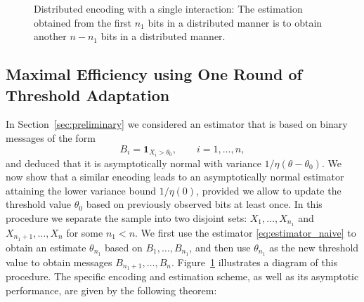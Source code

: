 \begin{figure}
\begin{center}
\end{center}
\caption{Distributed encoding with a single interaction: The estimation obtained from the first $n_1$ bits in a distributed manner is to obtain another $n-n_1$ bits in a distributed manner. 
\label{fig:one_round}
}
\end{figure}

\subsection{Maximal Efficiency using One Round of Threshold Adaptation}
In Section~\ref{sec:preliminary} we considered an estimator that is based on binary messages of the form 
\begin{equation*}
B_i = \mathbf 1_{X_i > \theta_0},\qquad i=1,\ldots,n,
\end{equation*}
and deduced that it is asymptotically normal with variance $1/\eta(\theta-\theta_0)$.
%
We now show that a similar encoding leads to an asymptotically normal estimator attaining the lower variance bound $1/\eta(0)$, provided we allow to  update the threshold value $\theta_0$ based on previously observed bits at least once. 
%
In this procedure we separate the sample into two disjoint sets: $X_1,\ldots,X_{n_1}$ and $X_{n_1+1},\ldots,X_n$ for some $n_1 < n$.
We first use the estimator \eqref{eq:estimator_naive} to obtain an estimate ${\theta}_{n_1}$ based on $B_1,\ldots,B_{n_1}$, and then use ${\theta}_{n_1}$ as the new threshold value to obtain messages $B_{n_1+1}, \ldots, B_n$. Figure~\ref{fig:one_round} illustrates a diagram of this procedure. 
%
The specific encoding and estimation scheme, as well as its asymptotic performance, are given by the following theorem:
